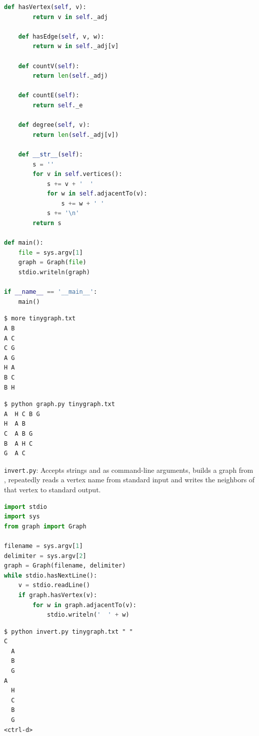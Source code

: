 \documentclass[8pt,a4paper,compress,handout]{beamer}
\begin{document}
\begin{frame}[fragile]
\begin{lstlisting}[language=Python]
    def hasVertex(self, v):
        return v in self._adj

    def hasEdge(self, v, w):
        return w in self._adj[v]
    
    def countV(self):
        return len(self._adj)
    
    def countE(self):
        return self._e
    
    def degree(self, v):
        return len(self._adj[v])

    def __str__(self):
        s = ''
        for v in self.vertices():
            s += v + '  '
            for w in self.adjacentTo(v):
                s += w + ' '
            s += '\n'
        return s

def main():
    file = sys.argv[1]
    graph = Graph(file)
    stdio.writeln(graph)

if __name__ == '__main__':
    main()
\end{lstlisting}
\end{frame}

\begin{frame}[fragile]
\begin{lstlisting}[language={}]
$ more tinygraph.txt
A B
A C
C G
A G
H A
B C
B H
\end{lstlisting}

\begin{lstlisting}[language={}]
$ python graph.py tinygraph.txt 
A  H C B G 
H  A B 
C  A B G 
B  A H C 
G  A C 

\end{lstlisting}
\end{frame}

\begin{frame}[fragile]
\begin{framed}
\tiny \lstinline{invert.py}: Accepts strings  and  as command-line arguments, builds a graph from , repeatedly reads a vertex name from standard input and writes the neighbors of that vertex to standard output.
\end{framed}

\begin{lstlisting}[language=Python]
import stdio
import sys
from graph import Graph

filename = sys.argv[1]
delimiter = sys.argv[2]
graph = Graph(filename, delimiter)
while stdio.hasNextLine():
    v = stdio.readLine()
    if graph.hasVertex(v):
        for w in graph.adjacentTo(v):
            stdio.writeln('  ' + w)
\end{lstlisting}

\begin{lstlisting}[language={}]
$ python invert.py tinygraph.txt " "
C
  A
  B
  G
A
  H
  C
  B
  G
<ctrl-d>
\end{lstlisting}
\end{frame}
\end{document}
